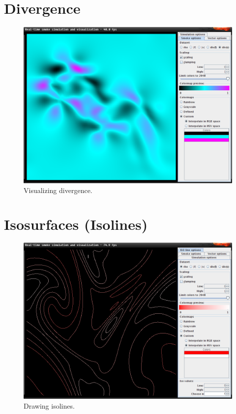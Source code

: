 \documentclass[a4paper,11pt,twoside]{report}
\begin{document}
	\section{Divergence}
		\begin{figure}[h]
		\centering
		\includegraphics[scale=\imagescalefactor]{images/step4.png}
		\caption{Visualizing divergence.}\label{fig:step4}
		\end{figure}
		\clearpage
	\section{Isosurfaces (Isolines)}
		\begin{figure}[h]
		\centering
		\includegraphics[scale=\imagescalefactor]{images/step5.png}
		\caption{Drawing isolines.}\label{fig:step5}
		\end{figure}
		\clearpage
\end{document}

